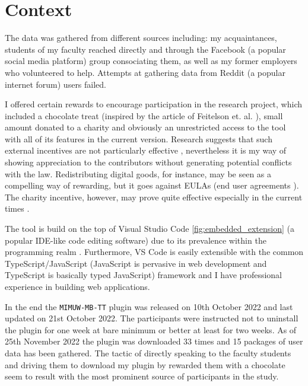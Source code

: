 \section{Context}


The data was gathered from different sources including: my acquaintances, students of my faculty reached directly and through the Facebook (a popular social media platform) group consociating them, as well as my former employers who volunteered to help. Attempts at gathering data from Reddit (a popular internet forum) users failed.

I offered certain rewards to encourage participation in the research project, which included a chocolate treat (inspired by the article of Feitelson et. al. \cite{Fei22DeveloperNames}), small amount donated to a charity and obviously an unrestricted access to the tool with all of its features in the current version. Research suggests that such external incentives are not particularly effective \cite{Coh19AltruisticSurvey, Bru11DifferentMotivations}, nevertheless it is my way of showing appreciation to the contributors without generating potential conflicts with the law. Redistributing digital goods, for instance, may be seen as a compelling way of rewarding, but it goes against EULAs (end user agreements \cite{EULA}). The charity incentive, however, may prove quite effective especially in the current times \cite{Forbes22Philanthropy}.

The tool is build on the top of Visual Studio Code \ref{fig:embedded_extension} (a popular IDE-like code editing software) due to its prevalence within the programming realm \cite{StackOverflow22Survey}. Furthermore, VS Code is easily extensible with the common TypeScript/JavaScript (JavaScript is pervasive in web development and TypeScript is basically typed JavaScript) framework and I have professional experience in building web applications.

In the end the \texttt{MIMUW-MB-TT} plugin was released on 10th October 2022 and last updated on 21st October 2022. The participants were instructed not to uninstall the plugin for one week at bare minimum or better at least for two weeks. As of 25th November 2022 the plugin was downloaded 33 times and 15 packages of user data has been gathered. The tactic of directly speaking to the faculty students and driving them to download my plugin by rewarded them with a chocolate seem to result with the most prominent source of participants in the study.

